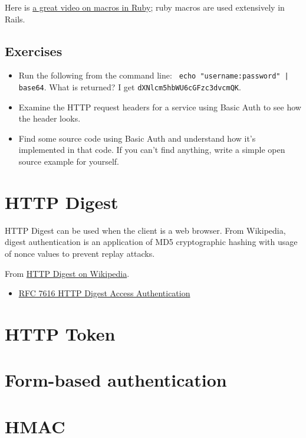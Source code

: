\documentclass{article}
\begin{document}
Here is \href{https://www.youtube.com/watch?v=O1sgFzn_Pgk}{%
a great video on macros in Ruby}; ruby macros are used extensively in Rails.

\subsection{Exercises}

\begin{itemize}
  \item Run the following from the command line: \texttt{%
      echo "username:password" | base64}. What is returned?
    I get \texttt{dXNlcm5hbWU6cGFzc3dvcmQK}.
  \item Examine the HTTP request headers for a service using Basic Auth
    to see how the header looks.
  \item Find some source code using Basic Auth and understand how
    it's implemented in that code. If you can't find anything, write
    a simple open source example for yourself.
\end{itemize}

\section{HTTP Digest}

HTTP Digest can be used when the client is a web browser. From Wikipedia,
digest authentication is an application of MD5 cryptographic hashing with usage
of nonce values to prevent replay attacks.

From \href{https://en.wikipedia.org/wiki/Digest_access_authentication}{HTTP Digest on Wikipedia}.

\begin{itemize}
  \item \href{https://tools.ietf.org/html/rfc7616}{%
      RFC 7616 HTTP Digest Access Authentication}
\end{itemize}

\section{HTTP Token}

\section{Form-based authentication}

\section{HMAC}
\end{document}
